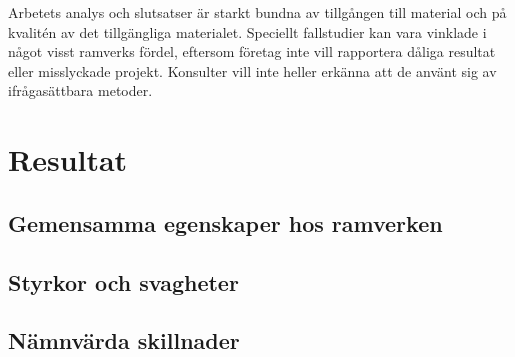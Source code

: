 

Arbetets analys och slutsatser är starkt bundna av tillgången till material och på kvalitén av det tillgängliga materialet. Speciellt fallstudier kan vara vinklade i något visst ramverks fördel, eftersom företag inte vill rapportera dåliga resultat eller misslyckade projekt. Konsulter vill inte heller erkänna att de använt sig av ifrågasättbara metoder.

\newpage

\section{Resultat}

\subsection{Gemensamma egenskaper hos ramverken}

\subsection{Styrkor och svagheter}

\subsection{Nämnvärda skillnader}
